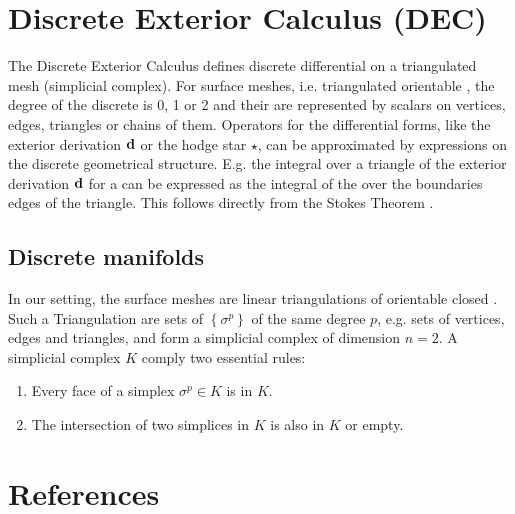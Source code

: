 \section{Discrete Exterior Calculus (DEC)}
  The Discrete Exterior Calculus \citep{hirani, desbrun} defines discrete differential  on a triangulated mesh (simplicial complex).
  For surface meshes, i.e. triangulated orientable , the degree of the discrete  is 0, 1 or 2
  and their are represented by scalars on vertices, edges, triangles or chains of them. 
  Operators for the differential forms, like the exterior derivation \( \mathbf{d} \) or the hodge star \( \star \), can be approximated by expressions on the discrete
  geometrical structure. 
  E.g. the integral over a triangle of the exterior derivation \( \mathbf{d} \) for a  can be expressed as the integral of the
   over the boundaries edges of the triangle. 
  This follows directly from the Stokes Theorem \citep[Ch. 7]{marsden}. 
 
  \subsection{Discrete manifolds}
    In our setting, the surface meshes are linear triangulations of orientable closed .
    Such a Triangulation are sets of  \( \left\{ \sigma^{p} \right\} \) of the same degree \( p \), e.g. sets of vertices,
    edges and triangles, and form a simplicial complex of dimension \( n=2 \).
    A simplicial complex \( K \) comply two essential rules:
    \begin{enumerate}
      \item Every face of a simplex \( \sigma^{p}\in K \) is in \( K \).
      \item The intersection of two simplices in \( K \) is also in \( K \) or empty.
    \end{enumerate}
    

  


\section*{References}




